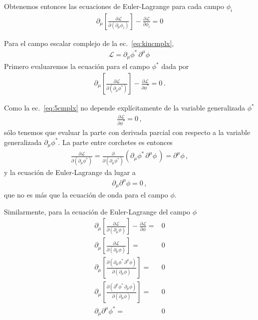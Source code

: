 \begin{frame}
Obtenemos entonces las ecuaciones de Euler-Lagrange para cada campo $\phi_i$
\begin{align}
\label{eq:eelcallfmu}
  \partial_{\mu} \left[ \frac{\partial\mathcal{L}}{\partial(\partial_{\mu}\phi_i)}\right]-\frac{\partial\mathcal{L}}{\partial\phi_i}=0
\end{align}

\end{frame}

Para el campo escalar complejo de la ec.~\eqref{eq:kincmplx},
\begin{align}
  \label{eq:5cmplx}
  \mathcal{L}=  {\partial_\mu\phi^{*}}\,{\partial^\mu\phi}\,
\end{align}
Primero evaluaremos la ecuación para el campo $\phi^*$ dada por
\begin{align*}
  \partial_{\mu} \left[ \frac{\partial\mathcal{L}}{\partial(\partial_{\mu}\phi^*)}\right]-\frac{\partial\mathcal{L}}{\partial\phi^*}=0\,.
\end{align*}

Como la ec.~\eqref{eq:5cmplx} no depende explícitamente de la variable generalizada $\phi^*$
\begin{align}
  \frac{\partial\mathcal{L}}{\partial\phi^*}=0\,,
\end{align}
sólo tenemos que evaluar la parte con derivada parcial con respecto a la variable generalizada
$\partial_\mu\phi^*$. La parte entre corchetes es entonces
\begin{align}
  \frac{\partial\mathcal{L}}{\partial(\partial_{\mu}\phi^*)} =
  \frac{\partial}{\partial(\partial_{\mu}\phi^*)}\left( {\partial_\mu\phi^{*}}\,{\partial^\mu\phi}\,\right)  = \partial^\mu\phi\,,
\end{align}
y la ecuación de Euler-Lagrange da lugar a
\begin{align}
  \partial_\mu \partial^\mu\phi = 0\,,
\end{align}
que no es más que la ecuación de onda para el campo $\phi$.

Similarmente, para la ecuación de Euler-Lagrange del campo $\phi$
\begin{align*}
  \partial_{\mu} \left[ \frac{\partial\mathcal{L}}{\partial(\partial_{\mu}\phi)}\right]-\frac{\partial\mathcal{L}}{\partial\phi}=&0\\
  \partial_{\mu} \left[ \frac{\partial\mathcal{L}}{\partial(\partial_{\mu}\phi)}\right]=&0\\
  \partial_{\mu} \left[ \frac{\partial\mathcal{\left({\partial_\mu\phi^{*}}\,{\partial^\mu\phi}\right)}}{\partial(\partial_{\mu}\phi)}\right]=&0\\
  \partial_{\mu} \left[ \frac{\partial\mathcal{\left({\partial^\mu\phi^{*}}\,{\partial_\mu\phi}\right)}}{\partial(\partial_{\mu}\phi)}\right]=&0\\
     \partial_{\mu} \partial^\mu\phi^{*}=&0
\end{align*}

